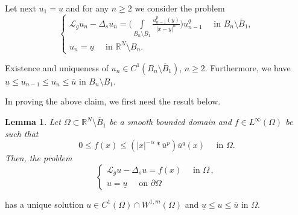 \documentclass[leqno,12pt]{article}
\numberwithin{equation}{section}
\newcommand{\R}{\mathbb R}
\newcommand{\Ro}{\mathbb R^N\setminus \overline B_1}
\newcommand{\Lg}{{\mathcal L}_g}
\newtheorem{lemma}[theorem]{Lemma}
\begin{document}
Let next $u_1=\underline u$ and for any $n\geq 2$ we consider the problem
\begin{equation}\label{iter1}
\begin{cases}
\Lg u_n-\Delta_s u_n  \displaystyle =\Big(\int\limits_{B_n\setminus B_1}\frac{u_{n-1}^p(y)}{|x-y|^\alpha}\Big)u_{n-1}^q \quad\mbox{ in }B_n\setminus \overline B_1,\\[0.1in]
u_n  =\underline u \quad\mbox{ in }\R^N\setminus B_n.
\end{cases}
\end{equation}

\smallskip

 Existence and uniqueness of $u_n\in C^1(B_n\setminus \overline B_1)$, $n\geq 2$. Furthermore, we have $\underline u\leq u_{n-1}\leq u_{n}\leq \overline u$ in $B_{n}\setminus B_1$.

In proving the above claim, we first need the result below. 

\begin{lemma}\label{LG}
Let $\Omega\subset \Ro$ be a smooth bounded domain and $f\in L^\infty(\Omega)$ be such that 
\begin{equation}\label{ff0}
0\leq f(x)\leq (|x|^{-\alpha}*\overline u^p)\overline u^q(x)\quad\mbox{  in }\Omega.
\end{equation}
Then, the problem
\begin{equation}\label{iter2}
\begin{cases}
\Lg u-\Delta_s u  \displaystyle =f(x) \quad\mbox{ in }\Omega\, ,\\
u  =\underline u \quad\mbox{ on }\partial\Omega
\end{cases}
\end{equation}
\end{lemma}
has a unique solution $u\in C^1(\Omega)\cap W^{1,m}(\Omega)$ and $\underline u\leq u\leq \overline u$ in $\Omega$.
\end{document}
